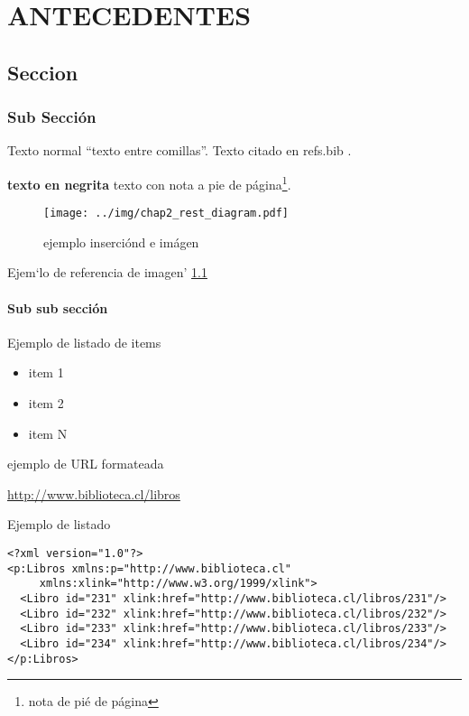 \chapter{ANTECEDENTES}

\section{Seccion}
\label{chap2:rest}

\subsection{Sub Sección}

Texto normal ``texto entre comillas''. Texto citado en refs.bib \cite{rthomas}.

\textbf{texto en negrita} texto con nota a pie de página\footnote{nota de pié de página}.

\begin{figure}[htb]
\centering
\texttt{[image: ../img/chap2\_rest\_diagram.pdf]}
\caption{ejemplo inserciónd e imágen}
\label{fig:restDiagram}
\end{figure}

Ejem`lo de referencia de imagen' \ref{fig:restDiagram}

\subsubsection{Sub sub sección}

Ejemplo de listado de items

\begin{itemize}
\item item 1
\item item 2
\item item N
\end{itemize}

ejemplo de URL formateada

\url{http://www.biblioteca.cl/libros}

Ejemplo de listado

\lstset{language=XML}

\begin{lstlisting}[caption=Listado de libros obtenido del Servicio Web., label=xmllisting]
<?xml version="1.0"?>
<p:Libros xmlns:p="http://www.biblioteca.cl"
     xmlns:xlink="http://www.w3.org/1999/xlink">
  <Libro id="231" xlink:href="http://www.biblioteca.cl/libros/231"/>
  <Libro id="232" xlink:href="http://www.biblioteca.cl/libros/232"/>
  <Libro id="233" xlink:href="http://www.biblioteca.cl/libros/233"/>
  <Libro id="234" xlink:href="http://www.biblioteca.cl/libros/234"/>
</p:Libros>
\end{lstlisting}

